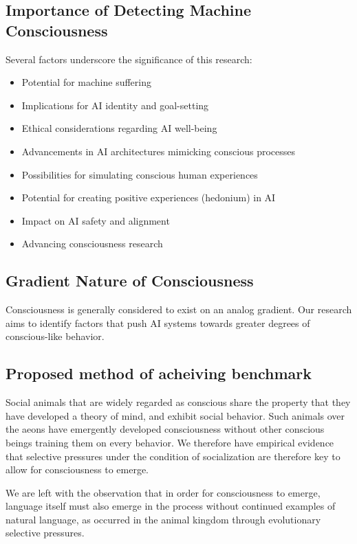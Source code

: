 \documentclass{article}
\begin{document}
\subsection{Importance of Detecting Machine Consciousness}
Several factors underscore the significance of this research:
\begin{itemize}
    \item Potential for machine suffering
    \item Implications for AI identity and goal-setting
    \item Ethical considerations regarding AI well-being
    \item Advancements in AI architectures mimicking conscious processes
    \item Possibilities for simulating conscious human experiences
    \item Potential for creating positive experiences (hedonium) in AI
    \item Impact on AI safety and alignment
    \item Advancing consciousness research
\end{itemize}

\subsection{Gradient Nature of Consciousness}
Consciousness is generally considered to exist on an analog gradient. Our research aims to identify factors that push AI systems towards greater degrees of conscious-like behavior.

\subsection{Proposed method of acheiving benchmark}

Social animals that are widely regarded as conscious share the property that they have developed a theory of mind, and exhibit social behavior. Such animals over the aeons have emergently developed consciousness without other conscious beings training them on every behavior. We therefore have empirical evidence that selective pressures under the condition of socialization are therefore key to allow for consciousness to emerge.

We are left with the observation that in order for consciousness to emerge, language itself must also emerge in the process without continued examples of natural language, as occurred in the animal kingdom through evolutionary selective pressures.
\end{document}
